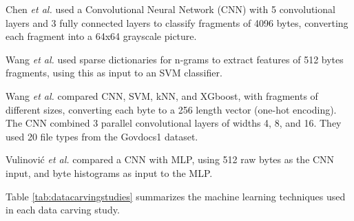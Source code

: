 Chen \textit{et al.} \cite{chen_file_2018}
used a Convolutional Neural Network (CNN) with 5 convolutional layers and 3 fully connected layers to classify fragments of 4096 bytes, converting each fragment into a 64x64 grayscale picture.

Wang \textit{et al.} \cite{wang_sparse_2018} 
used sparse dictionaries for n-grams to extract features of 512 bytes fragments, using this as input to an SVM classifier.

Wang \textit{et al.} \cite{wang_file_2018}  
compared CNN, SVM, kNN, and XGboost, with fragments of different sizes, converting each byte to a 256 length vector (one-hot encoding). The CNN combined 3 parallel convolutional layers of widths 4, 8, and 16.
They used 20 file types from the Govdocs1 dataset.

Vulinović \textit{et al.} \cite{vulinovic_neural_2019}
compared a CNN with MLP, using 512 raw bytes as the CNN input, and byte histograms as input to the MLP.

Table \ref{tab:datacarvingstudies} summarizes the  machine learning techniques used in each data carving study.

